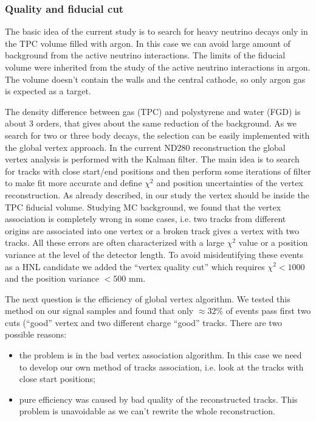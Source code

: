 \documentclass[../main.tex]{subfiles}
\begin{document}
\subsubsection{Quality and fiducial cut}
\label{sec:HNL:qf}
The basic idea of the current study is to search for heavy neutrino decays only in the TPC volume filled with argon. In this case we can avoid large amount of background from the active neutrino interactions. The limits of the fiducial volume were inherited from the study of the active neutrino interactions in argon. The volume doesn't contain the walls and the central cathode, so only argon gas is expected as a target.

The density difference between gas (TPC) and polystyrene and water (FGD) is about 3 orders, that gives about the same reduction of the background. As we search for two or three body decays, the selection can be easily implemented with the global vertex approach. In the current ND280 reconstruction the global vertex analysis is performed with the Kalman filter. The main idea is to search for tracks with close start/end positions and then perform some iterations of filter to make fit more accurate and define $\chi^2$ and position uncertainties of the vertex reconstruction. As already described, in our study the vertex should be inside the TPC fiducial volume. Studying MC background, we found that the vertex association is completely wrong in some cases, i.e. two tracks from different origins are associated into one vertex or a broken track gives a vertex with two tracks. All these errors are often characterized with a large $\chi^2$ value or a position variance at the level of the detector length. To avoid misidentifying these events as a HNL candidate we added the ``vertex quality cut'' which requires $\chi^2<1000$ and the position variance $<500$ mm.


The next question is the efficiency of global vertex algorithm. We tested this method on our signal samples and found that only $\approx32\%$ of events pass first two cuts (``good'' vertex and two different charge ``good'' tracks. There are two possible reasons:
\begin{itemize}
  \item the problem is in the bad vertex association algorithm. In this case we need to develop our own method of tracks association, i.e. look at the tracks with close start positions;
  \item  pure efficiency was caused by bad quality of the reconstructed tracks. This problem is unavoidable as we can't rewrite the whole reconstruction.
\end{itemize}
\end{document}
